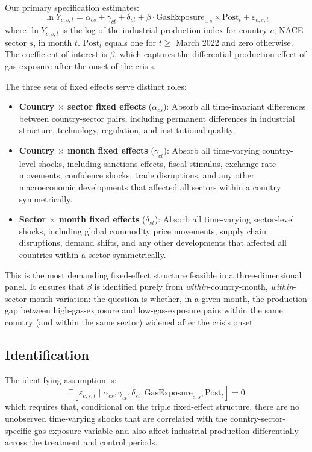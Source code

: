 \documentclass[12pt]{article}
\newcommand{\E}{\mathbb{E}}
\begin{document}
Our primary specification estimates:
\begin{equation}
\ln Y_{c,s,t} = \alpha_{cs} + \gamma_{ct} + \delta_{st} + \beta \cdot \text{GasExposure}_{c,s} \times \text{Post}_t + \varepsilon_{c,s,t}
\label{eq:main_spec}
\end{equation}
where $\ln Y_{c,s,t}$ is the log of the industrial production index for country $c$, NACE sector $s$, in month $t$. $\text{Post}_t$ equals one for $t \geq$ March 2022 and zero otherwise. The coefficient of interest is $\beta$, which captures the differential production effect of gas exposure after the onset of the crisis.

The three sets of fixed effects serve distinct roles:

\begin{itemize}
    \item \textbf{Country $\times$ sector fixed effects} ($\alpha_{cs}$): Absorb all time-invariant differences between country-sector pairs, including permanent differences in industrial structure, technology, regulation, and institutional quality.
    \item \textbf{Country $\times$ month fixed effects} ($\gamma_{ct}$): Absorb all time-varying country-level shocks, including sanctions effects, fiscal stimulus, exchange rate movements, confidence shocks, trade disruptions, and any other macroeconomic developments that affected all sectors within a country symmetrically.
    \item \textbf{Sector $\times$ month fixed effects} ($\delta_{st}$): Absorb all time-varying sector-level shocks, including global commodity price movements, supply chain disruptions, demand shifts, and any other developments that affected all countries within a sector symmetrically.
\end{itemize}

This is the most demanding fixed-effect structure feasible in a three-dimensional panel. It ensures that $\beta$ is identified purely from \textit{within}-country-month, \textit{within}-sector-month variation: the question is whether, in a given month, the production gap between high-gas-exposure and low-gas-exposure pairs within the same country (and within the same sector) widened after the crisis onset.

\subsection{Identification}

The identifying assumption is:
\begin{equation}
\E[\varepsilon_{c,s,t} \mid \alpha_{cs}, \gamma_{ct}, \delta_{st}, \text{GasExposure}_{c,s}, \text{Post}_t] = 0
\label{eq:id}
\end{equation}
which requires that, conditional on the triple fixed-effect structure, there are no unobserved time-varying shocks that are correlated with the country-sector-specific gas exposure variable and also affect industrial production differentially across the treatment and control periods.
\end{document}
